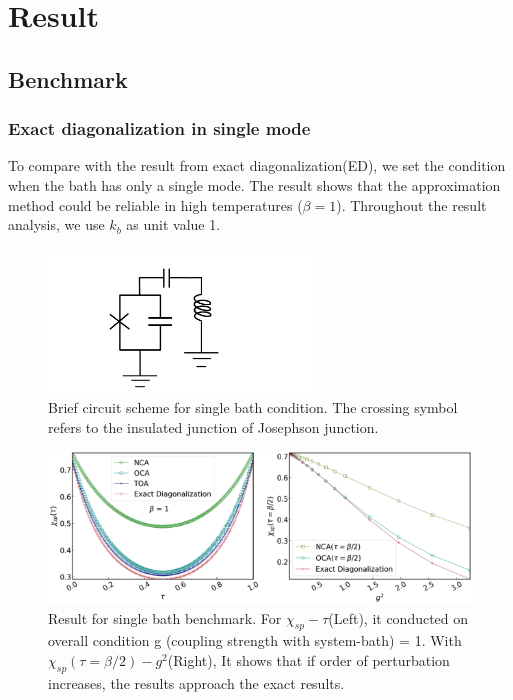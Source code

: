 \documentclass{article}[12pt]
\begin{document}
\section{Result}
\begin{spacing}{1.5}
\subsection{Benchmark}
\subsubsection*{Exact diagonalization in single mode}
To compare with the result from exact diagonalization(ED), we set the condition when the bath has only a single mode. 
The result shows that the approximation method could be reliable in high temperatures ($\beta = 1$). Throughout the result analysis, we use $k_b$ as unit value 1.
\begin{figure}[htbp]
  \centerline{\includegraphics[width=7cm]{TexFigure/kps_singlebath.png}}
  \caption{Brief circuit scheme for single bath condition. The crossing symbol  refers to the insulated junction of Josephson junction.}
\end{figure}
\begin{figure}[htbp]
  \centerline{\includegraphics[width=15cm]{TexFigure/4_1_01_Single.png}}
  \caption{Result for single bath benchmark. For $\chi_{sp} - \tau$(Left), it conducted on overall condition g (coupling strength with system-bath) = 1.
  With $\chi_{sp}(\tau=\beta/2)-g^2$(Right), It shows that if order of perturbation increases, the results approach the exact results.}
\end{figure}

\end{spacing}
\end{document}
